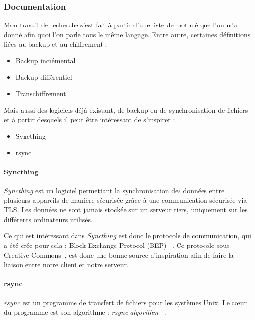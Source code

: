 \documentclass[a4paper,10pt, twoside]{report}
\begin{document}
\begin{spacing}{1.2}
\subsubsection{Documentation}
Mon travail de recherche s'est fait \`a partir d'une liste de mot cl\'e que
l'on m'a donn\'e afin quoi l'on parle tous le m\^eme langage. Entre autre,
certaines d\'efinitions li\'ees au backup et au chiffrement :
\begin{itemize}
 \item Backup incr\'emental
 \item Backup diff\'erentiel
 \item Transchiffrement
\end{itemize}

Mais aussi des logiciels d\'ej\`a existant, de backup ou de synchronisation de
fichiers et \`a partir desquels il peut \^etre int\'eressant de s'inspirer :
\begin{itemize}
 \item Syncthing~\cite{refSyncthing}
 \item rsync~\cite{refRsync}
\end{itemize}

\paragraph{Syncthing\\}
\textit{Syncthing} est un logiciel permettant la synchronisation des donn\'ees
entre plusieurs appareils de mani\`ere s\'ecuris\'ee gr\^ace \`a une
communication s\'ecuris\'ee via TLS. Les donn\'ees ne sont jamais stock\'ee
sur un serveur tiers, uniquement sur les diff\'erents ordinateurs utilis\'es.

Ce qui est int\'eressant dans \textit{Syncthing} est donc le protocole de
communication, qui a \'et\'e cr\'ee pour cela : Block Exchange Protocol (BEP)
~\cite{refBEP}. Ce protocole sous Creative Commons~\cite{refCC4.0}, est donc
une bonne source d'inspiration afin de faire la liaison entre notre client et
notre serveur.

\paragraph{rsync\\}
\textit{rsync} est un programme de transfert de fichiers pour les syst\`emes
Unix. Le c\oe ur du programme est son algorithme :
\textit{\flqq rsync algorithm \frqq}~\cite{refRsyncAlgo}.


\end{spacing}
\end{document}
